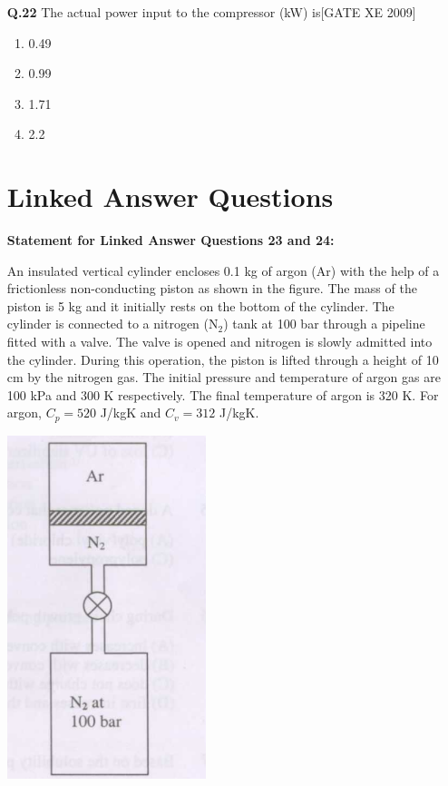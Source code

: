 \documentclass[journal,12pt,onecolumn]{IEEEtran}
\theoremstyle{remark}
\begin{document}
\begin{enumerate}
\vspace{0.3cm}

\item[\textbf{Q.22}] The actual power input to the compressor (kW) is\hfill[GATE XE 2009]
\begin{multicols}{2}
\begin{enumerate}
    \item 0.49
    \item 0.99
    \item 1.71
    \item 2.2
\end{enumerate}
\end{multicols}

\vspace{0.3cm}
\section*{Linked Answer Questions}

\textbf{Statement for Linked Answer Questions 23 and 24:}

An insulated vertical cylinder encloses 0.1 kg of argon (Ar) with the help of a frictionless non-conducting piston as shown in the figure. The mass of the piston is 5 kg and it initially rests on the bottom of the cylinder. The cylinder is connected to a nitrogen (N$_2$) tank at 100 bar through a pipeline fitted with a valve. The valve is opened and nitrogen is slowly admitted into the cylinder. During this operation, the piston is lifted through a height of 10 cm by the nitrogen gas. The initial pressure and temperature of argon gas are 100 kPa and 300 K respectively. The final temperature of argon is 320 K. For argon, $C_p = 520$ J/kgK and $C_v = 312$ J/kgK.


      \includegraphics[width=0.5\columnwidth]{figs/fig27.png}
    




\end{enumerate}
\end{document}
